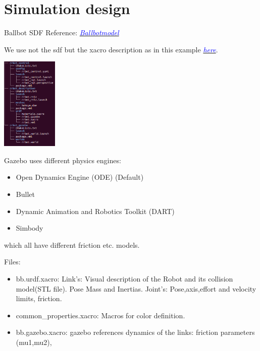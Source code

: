 \documentclass[twoside,colorback,accentcolor=tud4c,11pt]{tudreport}
\newcommand{\mylink}[2] {	\hyperlink{#1}{	\textit{\textcolor{blue}{#2}}}}
\begin{document}
\section{Simulation design}

Ballbot SDF Reference:
\mylink{https://bitbucket.org/osrf/gazebo/issues/2335/how-to-set-the-friction-of-ballbot-the}{Ballbotmodel} 

We use not the sdf but the xacro description as in this example \mylink{http://gazebosim.org/tutorials/?tut=ros_urdf}{here}.

\begin{center}
		\includegraphics[width=0.2\textwidth]{img/filestructure.png} 
\end{center}

Gazebo uses different physics engines:\\
\begin{itemize}
	\item Open Dynamics Engine (ODE) (Default)
	\item Bullet
	\item Dynamic Animation and Robotics Toolkit (DART)
	\item Simbody
\end{itemize}
 which all have different friction etc. models.

Files:
\begin{itemize}
	\item bb.urdf.xacro: Link's: Visual description of the Robot and its collision model(STL file). Pose Mass and Inertias. Joint's: Pose,axis,effort and velocity limits, friction.
	\item common\_properties.xacro: Macros for color definition.
	\item bb.gazebo.xacro: gazebo references dynamics of the links: friction parameters (mu1,mu2), 
\end{itemize}
\end{document}
